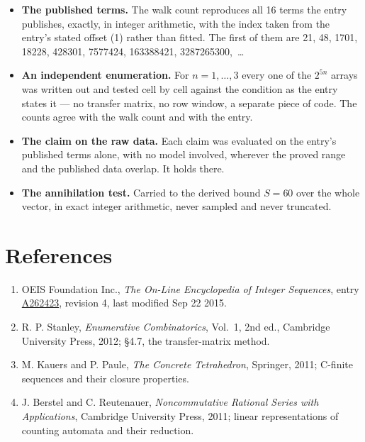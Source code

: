 \documentclass[11pt]{article}
\theoremstyle{definition}
\begin{document}
\begin{itemize}

\item {\bfseries The published terms.} The walk count reproduces all 16 terms the entry publishes, exactly, in integer arithmetic, with the index taken from the entry's stated offset (1) rather than fitted. The first of them are 21, 48, 1701, 18228, 428301, 7577424, 163388421, 3287265300,~\dots

\item {\bfseries An independent enumeration.} For $n = 1,\dots,3$ every one of the $2^{5n}$ arrays was written out and tested cell by cell against the condition as the entry states it --- no transfer matrix, no row window, a separate piece of code. The counts agree with the walk count and with the entry.

\item {\bfseries The claim on the raw data.} Each claim was evaluated on the entry's published terms alone, with no model involved, wherever the proved range and the published data overlap. It holds there.

\item {\bfseries The annihilation test.} Carried to the derived bound $S = 60$ over the whole vector, in exact integer arithmetic, never sampled and never truncated.

\end{itemize}

\section{References}

\begin{enumerate}

\item OEIS Foundation Inc., \emph{The On-Line Encyclopedia of Integer Sequences}, entry \href{https://oeis.org/A262423}{A262423}, revision 4, last modified Sep 22 2015.

\item R. P. Stanley, \emph{Enumerative Combinatorics}, Vol.~1, 2nd ed., Cambridge University Press, 2012; \S4.7, the transfer-matrix method.

\item M. Kauers and P. Paule, \emph{The Concrete Tetrahedron}, Springer, 2011; C-finite sequences and their closure properties.

\item J. Berstel and C. Reutenauer, \emph{Noncommutative Rational Series with Applications}, Cambridge University Press, 2011; linear representations of counting automata and their reduction.

\end{enumerate}
\end{document}

